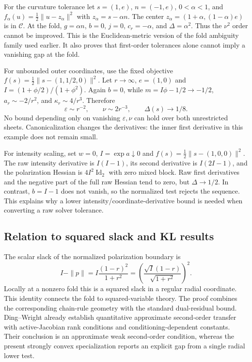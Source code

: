 For the curvature tolerance let $s=(1,e)$, $n=(-1,e)$, $0<\alpha<1$, and $f_\alpha(u)=\tfrac12\|u-z_\alpha\|^2$ with $z_\alpha=s-\alpha n$. The center $z_\alpha=(1+\alpha,(1-\alpha)e)$ is in $\mathcal C$. At the fold, $g=\alpha n$, $b=0$, $j=0$, $c_r=-\alpha$, and $\Delta=\alpha^2$. Thus the $\nu^2$ order cannot be improved. This is the Euclidean-metric version of the fold ambiguity family used earlier. It also proves that first-order tolerances alone cannot imply a vanishing gap at the fold.

For unbounded outer coordinates, use the fixed objective $f(s)=\tfrac12\|s-(1,1/2,0)\|^2$. Let $r\to\infty$, $e=(1,0)$ and $I=(1+\phi/2)/(1+\phi^2)$. Again $b=0$, while $m=I\phi-1/2\to-1/2$, $a_r\sim-2/r^2$, and $\kappa_r\sim4/r^3$. Therefore
\begin{equation}
 \varepsilon\sim r^{-2},\qquad\nu\sim2r^{-3},\qquad\Delta(s)\to1/8.
 \label{eq:sstopoutercounter}
\end{equation}
No bound depending only on vanishing $\varepsilon,\nu$ can hold over both unrestricted sheets. Canonicalization changes the derivatives: the inner first derivative in this example does not remain small.

For intensity scaling, set $w=0$, $I=\exp a\downarrow0$ and $f(s)=\tfrac12\|s-(1,0,0)\|^2$. The raw intensity derivative is $I(I-1)$, its second derivative is $I(2I-1)$, and the polarization Hessian is $4I^2\operatorname{Id}_2$ with zero mixed block. Raw first derivatives and the negative part of the full raw Hessian tend to zero, but $\Delta\to1/2$. In contrast, $b=I-1$ does not vanish, so the normalized test rejects the sequence. This explains why a lower intensity/coordinate-derivative bound is needed when converting a raw solver tolerance.

\subsection{Relation to squared slack and KL results}
The scalar slack of the normalized polarization boundary is
\begin{equation}
 I-\|p\|=I\frac{(1-r)^2}{1+r^2}
       =\left(\frac{\sqrt I(1-r)}{\sqrt{1+r^2}}\right)^2.
 \label{eq:sstopslacklink}
\end{equation}
Locally at a nonzero fold this is a squared slack in a regular radial coordinate. This identity connects the fold to squared-variable theory. The proof combines the corresponding chain-rule geometry with the standard dual-residual bound. Ding--Wright \cite[Thm.~3.6, Cor.~3.7]{dingwright} already establish quantitative approximate second-order transfer with active-Jacobian rank conditions and conditioning-dependent constants. Their conclusion is an approximate weak second-order condition, whereas the present strongly convex specialization reports an explicit gap from a single radial lower test.

